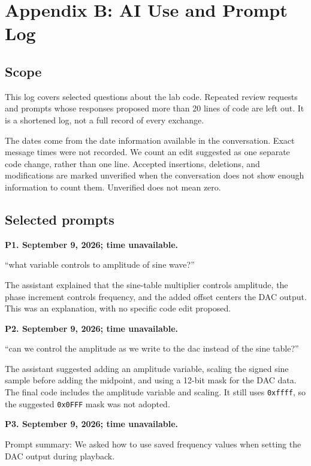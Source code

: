 \section*{Appendix B: AI Use and Prompt Log}

\subsection*{Scope}

This log covers selected questions about the lab code. Repeated review requests and prompts whose responses proposed more than 20 lines of code are left out. It is a shortened log, not a full record of every exchange.

The dates come from the date information available in the conversation. Exact message times were not recorded. We count an edit suggested as one separate code change, rather than one line. Accepted insertions, deletions, and modifications are marked unverified when the conversation does not show enough information to count them. Unverified does not mean zero.

\subsection*{Selected prompts}

\textbf{P1. September 9, 2026; time unavailable.}

``what variable controls to amplitude of sine wave?''

The assistant explained that the sine-table multiplier controls amplitude, the phase increment controls frequency, and the added offset centers the DAC output. This was an explanation, with no specific code edit proposed.

\textbf{P2. September 9, 2026; time unavailable.}

``can we control the amplitude as we write to the dac instead of the sine table?''

The assistant suggested adding an amplitude variable, scaling the signed sine sample before adding the midpoint, and using a 12-bit mask for the DAC data. The final code includes the amplitude variable and scaling. It still uses \texttt{0xffff}, so the suggested \texttt{0x0FFF} mask was not adopted.

\textbf{P3. September 9, 2026; time unavailable.}

Prompt summary: We asked how to use saved frequency values when setting the DAC output during playback.

